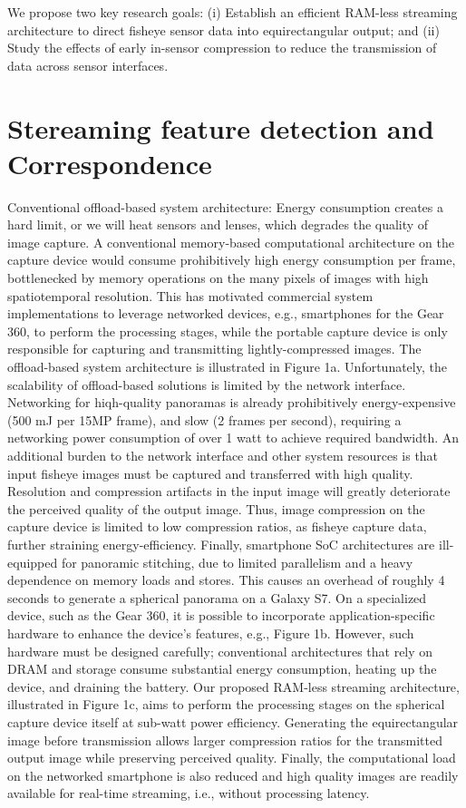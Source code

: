 We propose two key research goals: (i) Establish an efficient RAM-less streaming
architecture to direct fisheye sensor data into equirectangular output; and (ii) Study the effects
of early in-sensor compression to reduce the transmission of data across sensor interfaces.  \newline

\section{Stereaming feature detection and Correspondence}

Conventional offload-based system architecture: Energy consumption creates a hard limit, or we will heat sensors and lenses, which degrades the quality of image capture. A conventional memory-based computational architecture on the capture device would consume prohibitively high energy consumption per frame, bottlenecked by memory operations on the many pixels of images with high spatiotemporal resolution. This has motivated commercial system implementations to leverage networked devices, e.g., smartphones for the Gear 360, to perform the processing stages, while the portable capture device is only responsible for capturing and transmitting lightly-compressed images. The offload-based system architecture is illustrated in Figure 1a. Unfortunately, the scalability of offload-based solutions is limited by the network interface. Networking for hiqh-quality panoramas is already prohibitively energy-expensive (500 mJ per 15MP frame), and slow (2 frames per second), requiring a networking power consumption of over 1 watt to achieve required bandwidth. An additional burden to the network interface and other system resources is that input fisheye images must be captured and transferred with high quality. Resolution and compression artifacts in the input image will greatly deteriorate the perceived quality of the output image. Thus, image compression on the capture device is limited to low compression ratios, as fisheye capture data, further straining energy-efficiency. Finally, smartphone SoC architectures are ill-equipped for panoramic stitching, due to limited parallelism and a heavy dependence on memory loads and stores. This causes an overhead of roughly 4 seconds to generate a spherical panorama on a Galaxy S7. 
On a specialized device, such as the Gear 360, it is possible to incorporate application-specific hardware to enhance the device's features, e.g., Figure 1b. However, such hardware must be designed carefully; conventional architectures that rely on DRAM and storage consume substantial energy consumption, heating up the device, and draining the battery. Our proposed RAM-less streaming architecture, illustrated in Figure 1c, aims to perform the processing stages on the spherical capture device itself at sub-watt power efficiency. Generating the equirectangular image before transmission allows larger compression ratios for the transmitted output image while preserving perceived quality. Finally, the computational load on the networked smartphone is also reduced and high quality images are readily available for real-time streaming, i.e., without processing latency. 

